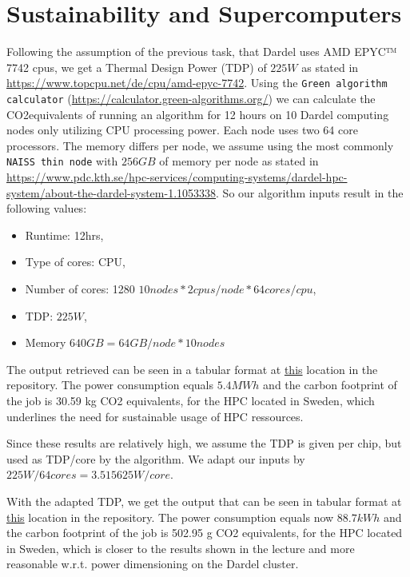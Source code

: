 \documentclass[a4paper,10pt]{article}
\begin{document}
\section{Sustainability and Supercomputers}
  Following the assumption of the previous task, that Dardel uses AMD EPYC™ 7742 cpus, we get a Thermal Design Power (TDP) of $ 225 W $ as stated in \url{https://www.topcpu.net/de/cpu/amd-epyc-7742}.
  Using the \verb|Green algorithm calculator| (\url{https://calculator.green-algorithms.org/}) we can calculate the CO2equivalents of running an algorithm for 12 hours on 10 Dardel computing nodes only utilizing CPU processing power.
  Each node uses two 64 core processors. The memory differs per node, we assume using the most commonly \verb|NAISS thin node| with $256GB $ of memory per node as stated in \url{https://www.pdc.kth.se/hpc-services/computing-systems/dardel-hpc-system/about-the-dardel-system-1.1053338}.
  So our algorithm inputs result in the following values:
  \begin{itemize}
    \item Runtime: 12hrs,
    \item Type of cores: CPU,
    \item Number of cores: 1280 $10 nodes*2 cpus/node*64cores/cpu$, 
    \item TDP: $225 W$,
    \item Memory $ 640 GB = 64GB/node * 10 nodes$
  \end{itemize}

  The output retrieved can be seen in a tabular format at \href{https://github.com/paulmyr/DD2356-MethodsHPC/blob/master/1_dardel_simple_benchmarking/misc/GreenAlgorithms_results_tabular.txt}{this} location in the repository.
  The power consumption equals $5.4 MWh$ and the carbon footprint of the job is 30.59 kg CO2 equivalents,
  for the HPC located in Sweden, which underlines the need for sustainable usage of HPC ressources.

  Since these results are relatively high, we assume the TDP is given per chip, but used as TDP/core by the algorithm. We adapt our inputs by $225W/64cores = 3.515625 W/core$.
  
  With the adapted TDP, we get the output that can be seen in tabular format at \href{https://github.com/paulmyr/DD2356-MethodsHPC/blob/master/1_dardel_simple_benchmarking/misc/GreenAlgorithms_results_TDP_tabular.txt}{this} location in the repository.
  The power consumption equals now $88.7 kWh$ and the carbon footprint of the job is 502.95 g CO2 equivalents,
  for the HPC located in Sweden, which is closer to the results shown in the lecture and more reasonable w.r.t. power dimensioning on the Dardel cluster.
\end{document}
